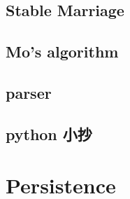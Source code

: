 \subsection{Stable Marriage}

\subsection{Mo's algorithm}

\subsection{parser}

\subsection{python 小抄}



\section{Persistence}

